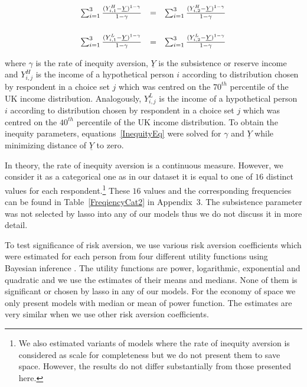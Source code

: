 \documentclass[a4paper,12pt]{article}
\begin{document}
\begin{equation}\label{InequityEq}
\begin{array}{lcl}

\sum_{i=1}^{3}\frac{(Y^H_{i,1}-\underline{Y})^{1-\gamma}}{1-\gamma} & =& \sum_{i=1}^{3}\frac{(Y^H_{i,2}-\underline{Y})^{1-\gamma}}{1-\gamma} \\

\vspace{0.2cm}\\
\sum_{i=1}^{3}\frac{(Y^L_{i,1}-\underline{Y})^{1-\gamma}}{1-\gamma} & =& \sum_{i=1}^{3}\frac{(Y^L_{i,2}-\underline{Y})^{1-\gamma}}{1-\gamma}
\end{array}
\end{equation}

where $\gamma$ is the rate of inequity aversion, $\underline{Y}$ is the subsistence or reserve income and $Y^H_{i,j}$ is the income of a hypothetical person $i$ according to distribution chosen by respondent in a choice set $j$ which was centred on the $70^{th}$ percentile of the UK income distribution. Analogously, $Y^L_{i,j}$ is the income of a hypothetical person $i$ according to distribution chosen by respondent in a choice set $j$ which was centred on the $40^{th}$ percentile of the UK income distribution. To obtain the inequity parameters, equations~\eqref{InequityEq} were solved for $\gamma$ and $\underline{Y}$ while minimizing distance of $\underline{Y}$ to zero.

In theory, the rate of inequity aversion is a continuous measure. However, we consider it as a categorical one as in our dataset it is equal to one of $16$ distinct values for each respondent.\footnote{We also estimated variants of models where the rate of inequity aversion is considered as scale for completeness but we do not present them to save space. However, the results do not differ substantially from those presented here.} These $16$ values and the corresponding frequencies can be found in Table~\ref{FreqiencyCat2} in Appendix~$3$. The subsistence parameter was not selected by lasso into any of our models thus we do not discuss it in more detail.


To test significance of risk aversion, we use various risk aversion coefficients which were estimated for each person from four different utility functions using Bayesian inference \citep{Balcombe2015}. The utility functions are power, logarithmic, exponential and quadratic and we use the estimates of their means and medians. None of them is significant or chosen by lasso in any of our models. For the economy of space we only present models with median or mean of power function. The estimates are very similar when we use other risk aversion coefficients.
\end{document}
